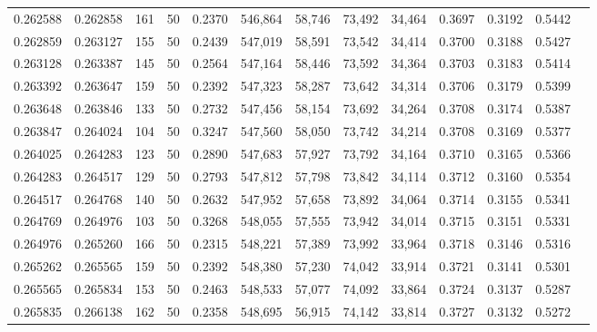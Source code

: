 \begin{tabular}{rrrrrrrrrrrrr}
0.262588 & 0.262858 &   161 &  50 &                                     0.2370 & 546,864 &  58,746 &  73,492 &  34,464 & 0.3697 & 0.3192 & 0.5442 \\
0.262859 & 0.263127 &   155 &  50 &                                     0.2439 & 547,019 &  58,591 &  73,542 &  34,414 & 0.3700 & 0.3188 & 0.5427 \\
0.263128 & 0.263387 &   145 &  50 &                                     0.2564 & 547,164 &  58,446 &  73,592 &  34,364 & 0.3703 & 0.3183 & 0.5414 \\
0.263392 & 0.263647 &   159 &  50 &                                     0.2392 & 547,323 &  58,287 &  73,642 &  34,314 & 0.3706 & 0.3179 & 0.5399 \\
0.263648 & 0.263846 &   133 &  50 &                                     0.2732 & 547,456 &  58,154 &  73,692 &  34,264 & 0.3708 & 0.3174 & 0.5387 \\
0.263847 & 0.264024 &   104 &  50 &                                     0.3247 & 547,560 &  58,050 &  73,742 &  34,214 & 0.3708 & 0.3169 & 0.5377 \\
0.264025 & 0.264283 &   123 &  50 &                                     0.2890 & 547,683 &  57,927 &  73,792 &  34,164 & 0.3710 & 0.3165 & 0.5366 \\
0.264283 & 0.264517 &   129 &  50 &                                     0.2793 & 547,812 &  57,798 &  73,842 &  34,114 & 0.3712 & 0.3160 & 0.5354 \\
0.264517 & 0.264768 &   140 &  50 &                                     0.2632 & 547,952 &  57,658 &  73,892 &  34,064 & 0.3714 & 0.3155 & 0.5341 \\
0.264769 & 0.264976 &   103 &  50 &                                     0.3268 & 548,055 &  57,555 &  73,942 &  34,014 & 0.3715 & 0.3151 & 0.5331 \\
0.264976 & 0.265260 &   166 &  50 &                                     0.2315 & 548,221 &  57,389 &  73,992 &  33,964 & 0.3718 & 0.3146 & 0.5316 \\
0.265262 & 0.265565 &   159 &  50 &                                     0.2392 & 548,380 &  57,230 &  74,042 &  33,914 & 0.3721 & 0.3141 & 0.5301 \\
0.265565 & 0.265834 &   153 &  50 &                                     0.2463 & 548,533 &  57,077 &  74,092 &  33,864 & 0.3724 & 0.3137 & 0.5287 \\
0.265835 & 0.266138 &   162 &  50 &                                     0.2358 & 548,695 &  56,915 &  74,142 &  33,814 & 0.3727 & 0.3132 & 0.5272 \\

\end{tabular}
